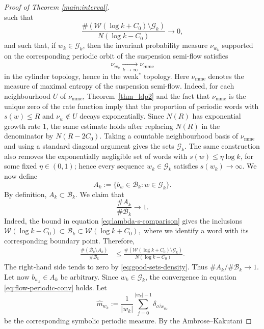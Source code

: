 \documentclass[letterpaper,11pt]{amsart}
\numberwithin{equation}{section}     %
\def\le{\leqslant}
\begin{document}
\begin{proof}[Proof of Theorem \ref{main:interval}]
\[\]
such that
\begin{equation}\label{eq:good-sets-density}
        \frac{\#(\mathcal W(\log k+C_0)\setminus \mathcal G_k)}
        {N(\log k-C_0)}\longrightarrow 0,
\end{equation}
and such that, if $w_k\in\mathcal G_k$, then the invariant probability measure
$\nu_{w_k}$ supported on the corresponding periodic orbit of the suspension
semi-flow satisfies
\begin{equation}\label{eq:flow-periodic-conv}
        \nu_{w_k}\xrightarrow[k\to\infty]{}\nu_{\mathrm{mme}}
\end{equation}
in the cylinder topology, hence in the weak$^\ast$ topology. Here
$\nu_{\mathrm{mme}}$ denotes the measure of maximal entropy of the suspension
semi-flow. Indeed, for each neighbourhood
$U$ of $\nu_{\mathrm{mme}}$, Theorem~\ref{thm_ldp2} and the fact that
$\nu_{\mathrm{mme}}$ is the unique zero of the rate function imply that the
proportion of periodic words with $s(w)\le R$ and $\nu_w\notin U$ decays
exponentially. Since $N(R)$ has exponential growth rate $1$, the same estimate
holds after replacing $N(R)$ in the denominator by $N(R-2C_0)$. Taking a
countable neighbourhood basis of $\nu_{\mathrm{mme}}$ and using a standard
diagonal argument gives the sets $\mathcal G_k$. The same construction also
removes the exponentially negligible set of words with $s(w)\le \eta\log k$,
for some fixed $\eta\in(0,1)$; hence every sequence $w_k\in\mathcal G_k$
satisfies $s(w_k)\to\infty$.  We now define
\[
        A_k:=\{b_w\in\mathcal B_k:w\in\mathcal G_k\}.
\]
By definition, $A_k\subset\mathcal B_k$. We claim that
\[
        \frac{\#A_k}{\#\mathcal B_k}\longrightarrow 1.
\]
Indeed, the bound in equation \eqref{eq:lambda-s-comparison} gives the inclusions $\mathcal W(\log k-C_0)\subset \mathcal B_k
        \subset \mathcal W(\log k+C_0), $ where we identify a word with its corresponding boundary point. Therefore,
\[
\begin{aligned}
 \frac{\#(\mathcal B_k\setminus A_k)}{\#\mathcal B_k}
 &\le
 \frac{\#(\mathcal W(\log k+C_0)\setminus \mathcal G_k)}
 {N(\log k-C_0)}.
\end{aligned}
\]
The right-hand side tends to zero by \eqref{eq:good-sets-density}. Thus
$\#A_k/\#\mathcal B_k\to1$. Let now $b_{w_k}\in A_k$ be arbitrary. Since $w_k\in\mathcal G_k$, the convergence in equation 
\eqref{eq:flow-periodic-conv} holds. Let
\[
        \widehat m_{w_k}
        :=\frac1{|w_k|}\sum_{j=0}^{|w_k|-1}\delta_{\sigma^j x_{w_k}}
\]
be the corresponding symbolic periodic measure. By the Ambrose--Kakutani

\end{proof}
\end{document}
